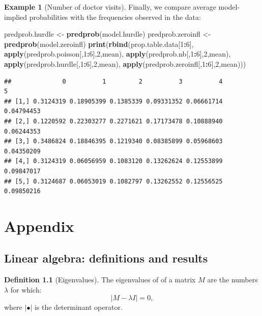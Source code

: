 \documentclass[
  12pt,
]{book}
\newenvironment{Shaded}{\begin{snugshade}}{\end{snugshade}}
\newcommand{\DecValTok}[1]{\textcolor[rgb]{0.00,0.00,0.81}{#1}}
\newcommand{\FunctionTok}[1]{\textcolor[rgb]{0.13,0.29,0.53}{\textbf{#1}}}
\newcommand{\NormalTok}[1]{#1}
\newcommand{\OtherTok}[1]{\textcolor[rgb]{0.56,0.35,0.01}{#1}}
\newcommand{\SpecialCharTok}[1]{\textcolor[rgb]{0.81,0.36,0.00}{\textbf{#1}}}
\theoremstyle{definition}
\newtheorem{definition}{Definition}[chapter]
\theoremstyle{definition}
\newtheorem{example}{Example}[chapter]
\theoremstyle{definition}
\theoremstyle{definition}
\theoremstyle{remark}
\begin{document}
\begin{example}[Number of doctor visits]
Finally, we compare average model-implied probabilities with the frequencies observed in the data:

\begin{Shaded}
\begin{Highlighting}[]
\NormalTok{predprob.hurdle   }\OtherTok{\textless{}{-}} \FunctionTok{predprob}\NormalTok{(model.hurdle)}
\NormalTok{predprob.zeroinfl }\OtherTok{\textless{}{-}} \FunctionTok{predprob}\NormalTok{(model.zeroinfl)}
\FunctionTok{print}\NormalTok{(}\FunctionTok{rbind}\NormalTok{(prop.table.data[}\DecValTok{1}\SpecialCharTok{:}\DecValTok{6}\NormalTok{],}
  \FunctionTok{apply}\NormalTok{(predprob.poisson[,}\DecValTok{1}\SpecialCharTok{:}\DecValTok{6}\NormalTok{],}\DecValTok{2}\NormalTok{,mean),}
  \FunctionTok{apply}\NormalTok{(predprob.nb[,}\DecValTok{1}\SpecialCharTok{:}\DecValTok{6}\NormalTok{],}\DecValTok{2}\NormalTok{,mean),}
  \FunctionTok{apply}\NormalTok{(predprob.hurdle[,}\DecValTok{1}\SpecialCharTok{:}\DecValTok{6}\NormalTok{],}\DecValTok{2}\NormalTok{,mean),}
  \FunctionTok{apply}\NormalTok{(predprob.zeroinfl[,}\DecValTok{1}\SpecialCharTok{:}\DecValTok{6}\NormalTok{],}\DecValTok{2}\NormalTok{,mean)))}
\end{Highlighting}
\end{Shaded}

\begin{verbatim}
##              0          1         2          3          4          5
## [1,] 0.3124319 0.18905399 0.1385339 0.09331352 0.06661714 0.04794453
## [2,] 0.1220592 0.22303277 0.2271621 0.17173478 0.10888940 0.06244353
## [3,] 0.3486824 0.18846395 0.1219340 0.08385899 0.05968603 0.04350209
## [4,] 0.3124319 0.06056959 0.1083120 0.13262624 0.12553899 0.09847017
## [5,] 0.3124687 0.06053019 0.1082797 0.13262552 0.12556525 0.09850216
\end{verbatim}

\end{example}

\hypertarget{append}{%
\chapter{Appendix}\label{append}}

\hypertarget{LinAlgebra}{%
\section{Linear algebra: definitions and results}\label{LinAlgebra}}

\begin{definition}[Eigenvalues]
\protect\hypertarget{def:determinant}{}\label{def:determinant}The eigenvalues of of a matrix \(M\) are the numbers \(\lambda\) for which:
\[
|M - \lambda I| = 0,
\]
where \(| \bullet |\) is the determinant operator.
\end{definition}
\end{document}
